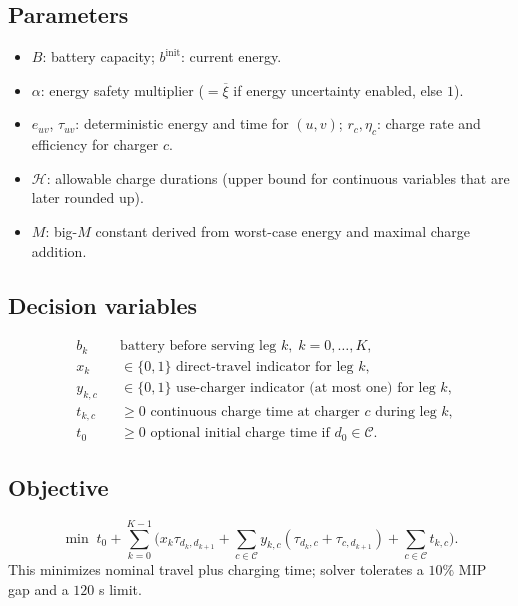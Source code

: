 \documentclass[11pt]{article}
\begin{document}
\subsection*{Parameters}
\begin{itemize}[nosep]
    \item $B$: battery capacity; $b^{\text{init}}$: current energy.
    \item $\alpha$: energy safety multiplier ($=\overline{\xi}$ if energy uncertainty enabled, else $1$).
    \item $e_{uv}$, $\tau_{uv}$: deterministic energy and time for $(u,v)$; $r_c,\eta_c$: charge rate and efficiency for charger $c$.
    \item $\mathcal{H}$: allowable charge durations (upper bound for continuous variables that are later rounded up).
    \item $M$: big-$M$ constant derived from worst-case energy and maximal charge addition.
\end{itemize}

\subsection*{Decision variables}
\begin{align*}
&b_k &&\text{battery before serving leg }k,\; k=0,\dots,K,\\
&x_k &&\in\{0,1\}\text{ direct-travel indicator for leg }k,\\
&y_{k,c} &&\in\{0,1\}\text{ use-charger indicator (at most one) for leg }k,\\
&t_{k,c} &&\ge 0\text{ continuous charge time at charger }c\text{ during leg }k,\\
&t_0 &&\ge 0\text{ optional initial charge time if }d_0\in\mathcal{C}.
\end{align*}

\subsection*{Objective}
\[
\min \; t_0 + \sum_{k=0}^{K-1}\Big( x_k \tau_{d_k,d_{k+1}} + \sum_{c\in\mathcal{C}} y_{k,c}(\tau_{d_k,c}+\tau_{c,d_{k+1}}) + \sum_{c\in\mathcal{C}} t_{k,c}\Big).
\]
This minimizes nominal travel plus charging time; solver tolerates a $10\%$ MIP gap and a $120$ s limit.
\end{document}

